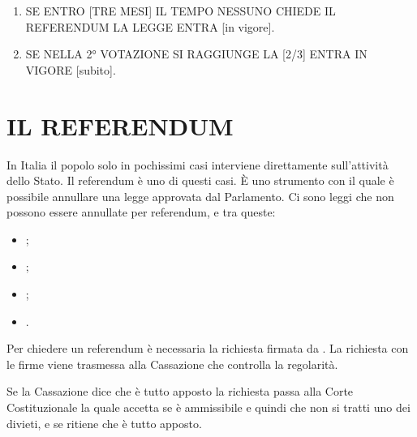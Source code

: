 \documentclass[letterpaper,10pt,italian]{sphinxmanual}
\begin{document}
\begin{enumerate}
%
\setcounter{enumi}{4}
\item {} 
\sphinxAtStartPar
SE ENTRO {[}TRE MESI{]} IL TEMPO NESSUNO CHIEDE IL REFERENDUM LA LEGGE ENTRA {[}in vigore{]}.

\item {} 
\sphinxAtStartPar
SE NELLA 2° VOTAZIONE SI RAGGIUNGE LA  {[}2/3{]} ENTRA IN VIGORE {[}subito{]}.

\end{enumerate}

\sphinxstepscope


\chapter{IL REFERENDUM}
\label{\detokenize{IL REFERENDUM:il-referendum}}\label{\detokenize{IL REFERENDUM::doc}}
\sphinxAtStartPar
In Italia il popolo solo in pochissimi casi interviene direttamente sull’attività dello Stato. Il referendum è uno di questi casi. È uno strumento con il quale è possibile annullare una legge approvata dal Parlamento. Ci sono leggi che non possono essere annullate per referendum, e tra queste:
\begin{itemize}
\item {} 
\sphinxAtStartPar
{};

\item {} 
\sphinxAtStartPar
{};

\item {} 
\sphinxAtStartPar
{};

\item {} 
\sphinxAtStartPar
{}.

\end{itemize}

\sphinxAtStartPar
Per chiedere un referendum è necessaria la richiesta firmata da .
La richiesta con le firme viene trasmessa alla Cassazione che controlla la regolarità.

\sphinxAtStartPar
Se la Cassazione dice che è tutto apposto la richiesta passa alla Corte Costituzionale la quale accetta se è
ammissibile e quindi che non si tratti uno dei divieti, e se ritiene che è tutto apposto.
\end{document}

